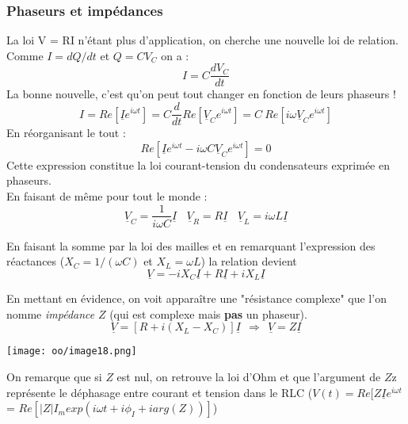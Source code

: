 \documentclass[british,french,11pt, a4paper, openany]{book}
\begin{document}
	\subsubsection{Phaseurs et impédances}
	La loi V = RI n'étant plus d'application, on cherche une nouvelle loi de relation. Comme $I = dQ/dt$ et $Q = CV_C$ on a :
	\begin{equation}
		I = C\frac{dV_C}{dt}
	\end{equation}
	La bonne nouvelle, c'est qu'on peut tout changer en fonction de leurs phaseurs ! 
	\begin{equation}
		I = Re\left[\underline{I}e^{i\omega t} \right] = C\frac{d}{dt}Re\left[\underline{V}_Ce^{i\omega t} \right] = C\ Re\left[i\omega\underline{V}_Ce^{i\omega t} \right]
	\end{equation}
	En réorganisant le tout :
	\begin{equation}
		Re\left[\underline{I}e^{i\omega t} - i\omega C\underline{V}_C e^{i\omega t} \right] = 0
	\end{equation}
	Cette expression constitue la loi courant-tension du condensateurs exprimée en phaseurs.\\
	
	En faisant de même pour tout le monde : 
	\begin{equation}
		\underline{V}_C = \frac{1}{i\omega C}\underline{I}\ \ \ \ \underline{V}_R = R\underline{I}\ \ \ \ \underline{V}_L = i\omega L\underline{I}
	\end{equation}
	
	En faisant la somme par la loi des mailles et en remarquant l'expression des réactances ($X_C = 1/(\omega C)$ et $X_L = \omega L$) la relation devient
	\begin{equation}
		\underline{V} = -iX_C\underline{I} + R\underline{I} + iX_L\underline{I}
	\end{equation}
	
	En mettant en évidence, on voit apparaître une "résistance complexe" que l'on nomme \textit{impédance} $Z$ (qui est complexe mais \textbf{pas} un phaseur).
	\begin{equation}
		\underline{V} = \left[R + i\left(X_L - X_C\right)\right]\underline{I}\ \ \Rightarrow\ \ \underline{V} = Z\underline{I}
	\end{equation}
	\begin{center}
		\texttt{[image: oo/image18.png]}
	\end{center}
	On remarque que si $Z$ est nul, on retrouve la loi d'Ohm et que l'argument de $Z$z représente le déphasage entre courant et tension dans le RLC ($V(t) = Re[Z\underline{I}e^{i\omega t}$ = $Re[|Z|I_m exp(i\omega t + i\phi_I + i arg(Z))]$)
		
\end{document}

